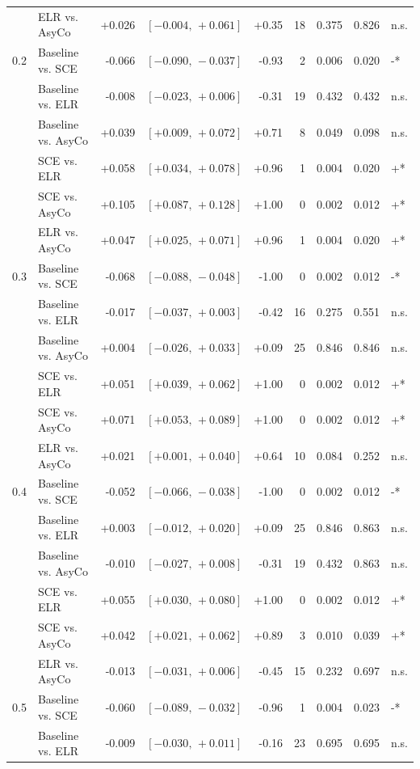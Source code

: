 \begin{small}
\begin{longtable}{llrrrrrrl}
 & ELR vs. AsyCo & +0.026 & $[-0.004,\,+0.061]$ & +0.35 & 18 & 0.375 & 0.826 & n.s. \\
0.2 & Baseline vs. SCE & -0.066 & $[-0.090,\,-0.037]$ & -0.93 & 2 & 0.006 & 0.020 & -* \\
 & Baseline vs. ELR & -0.008 & $[-0.023,\,+0.006]$ & -0.31 & 19 & 0.432 & 0.432 & n.s. \\
 & Baseline vs. AsyCo & +0.039 & $[+0.009,\,+0.072]$ & +0.71 & 8 & 0.049 & 0.098 & n.s. \\
 & SCE vs. ELR & +0.058 & $[+0.034,\,+0.078]$ & +0.96 & 1 & 0.004 & 0.020 & +* \\
 & SCE vs. AsyCo & +0.105 & $[+0.087,\,+0.128]$ & +1.00 & 0 & 0.002 & 0.012 & +* \\
 & ELR vs. AsyCo & +0.047 & $[+0.025,\,+0.071]$ & +0.96 & 1 & 0.004 & 0.020 & +* \\
0.3 & Baseline vs. SCE & -0.068 & $[-0.088,\,-0.048]$ & -1.00 & 0 & 0.002 & 0.012 & -* \\
 & Baseline vs. ELR & -0.017 & $[-0.037,\,+0.003]$ & -0.42 & 16 & 0.275 & 0.551 & n.s. \\
 & Baseline vs. AsyCo & +0.004 & $[-0.026,\,+0.033]$ & +0.09 & 25 & 0.846 & 0.846 & n.s. \\
 & SCE vs. ELR & +0.051 & $[+0.039,\,+0.062]$ & +1.00 & 0 & 0.002 & 0.012 & +* \\
 & SCE vs. AsyCo & +0.071 & $[+0.053,\,+0.089]$ & +1.00 & 0 & 0.002 & 0.012 & +* \\
 & ELR vs. AsyCo & +0.021 & $[+0.001,\,+0.040]$ & +0.64 & 10 & 0.084 & 0.252 & n.s. \\
0.4 & Baseline vs. SCE & -0.052 & $[-0.066,\,-0.038]$ & -1.00 & 0 & 0.002 & 0.012 & -* \\
 & Baseline vs. ELR & +0.003 & $[-0.012,\,+0.020]$ & +0.09 & 25 & 0.846 & 0.863 & n.s. \\
 & Baseline vs. AsyCo & -0.010 & $[-0.027,\,+0.008]$ & -0.31 & 19 & 0.432 & 0.863 & n.s. \\
 & SCE vs. ELR & +0.055 & $[+0.030,\,+0.080]$ & +1.00 & 0 & 0.002 & 0.012 & +* \\
 & SCE vs. AsyCo & +0.042 & $[+0.021,\,+0.062]$ & +0.89 & 3 & 0.010 & 0.039 & +* \\
 & ELR vs. AsyCo & -0.013 & $[-0.031,\,+0.006]$ & -0.45 & 15 & 0.232 & 0.697 & n.s. \\
0.5 & Baseline vs. SCE & -0.060 & $[-0.089,\,-0.032]$ & -0.96 & 1 & 0.004 & 0.023 & -* \\
 & Baseline vs. ELR & -0.009 & $[-0.030,\,+0.011]$ & -0.16 & 23 & 0.695 & 0.695 & n.s. \\

\end{longtable}
\end{small}
